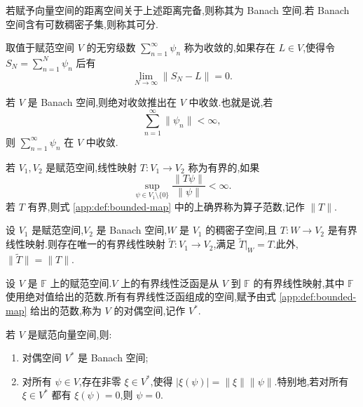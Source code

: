 \begin{definition}[Banach 空间]\label{app:def:banach}
若赋予向量空间的距离空间关于上述距离完备,则称其为 Banach 空间.若 Banach 空间含有可数稠密子集,则称其可分.
\end{definition}

\begin{definition}[级数的收敛]\label{app:def:banach-series}
取值于赋范空间 \(V\) 的无穷级数 \(\sum_{n=1}^{\infty}\psi_n\) 称为收敛的,如果存在 \(L\in V\),使得令 \(S_N=\sum_{n=1}^N\psi_n\) 后有
\[
\lim_{N\to\infty}\|S_N-L\|=0.
\]
\end{definition}

\begin{proposition}[绝对收敛推出收敛]\label{app:prop:absolute-convergence}
若 \(V\) 是 Banach 空间,则绝对收敛推出在 \(V\) 中收敛.也就是说,若
\[
\sum_{n=1}^{\infty}\|\psi_n\|<\infty,
\]
则 \(\sum_{n=1}^{\infty}\psi_n\) 在 \(V\) 中收敛.
\end{proposition}

\begin{definition}[有界线性映射与算子范数]\label{app:def:bounded-map}
若 \(V_1,V_2\) 是赋范空间,线性映射 \(T:V_1\to V_2\) 称为有界的,如果
\[
\sup_{\psi\in V_1\setminus\{0\}}\frac{\|T\psi\|}{\|\psi\|}<\infty.\tag{A.6}
\]
若 \(T\) 有界,则式 \ref{app:def:bounded-map} 中的上确界称为算子范数,记作 \(\|T\|\).
\end{definition}

\begin{theorem}[有界线性变换定理]\label{app:thm:bounded-extension}
设 \(V_1\) 是赋范空间,\(V_2\) 是 Banach 空间,\(W\) 是 \(V_1\) 的稠密子空间,且 \(T:W\to V_2\) 是有界线性映射.则存在唯一的有界线性映射 \(\widetilde T:V_1\to V_2\),满足 \(\widetilde T|_W=T\).此外,\(\|\widetilde T\|=\|T\|\).
\end{theorem}

\begin{definition}[有界线性泛函与对偶空间]\label{app:def:dual}
设 \(V\) 是 \(\mathbb F\) 上的赋范空间.\(V\) 上的有界线性泛函是从 \(V\) 到 \(\mathbb F\) 的有界线性映射,其中 \(\mathbb F\) 使用绝对值给出的范数.所有有界线性泛函组成的空间,赋予由式 \ref{app:def:bounded-map} 给出的范数,称为 \(V\) 的对偶空间,记作 \(V^*\).
\end{definition}

\begin{theorem}\label{app:thm:dual-banach}
若 \(V\) 是赋范向量空间,则:
\begin{enumerate}
  \item 对偶空间 \(V^*\) 是 Banach 空间;
  \item 对所有 \(\psi\in V\),存在非零 \(\xi\in V^*\),使得 \(|\xi(\psi)|=\|\xi\|\|\psi\|\).特别地,若对所有 \(\xi\in V^*\) 都有 \(\xi(\psi)=0\),则 \(\psi=0\).
\end{enumerate}
\end{theorem}

